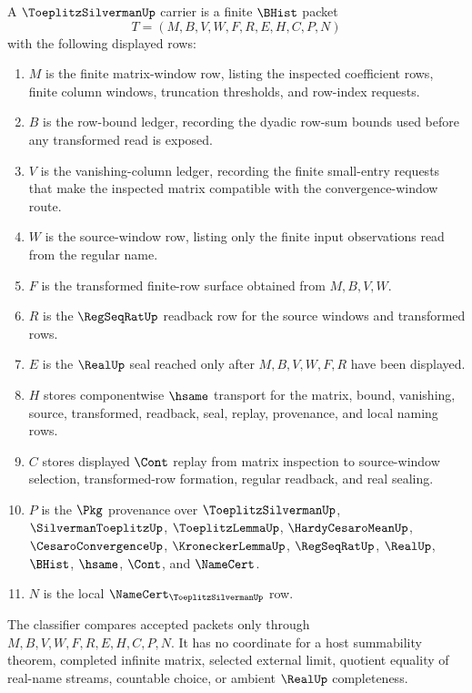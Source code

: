\begin{definition}\label{def:toeplitz-silverman-carrier}
A $\ToeplitzSilvermanUp$ carrier is a finite $\BHist$ packet
$$
T=(M,B,V,W,F,R,E,H,C,P,N)
$$
with the following displayed rows:
\begin{enumerate}
\item $M$ is the finite matrix-window row, listing the inspected coefficient rows, finite column windows, truncation thresholds, and row-index requests.
\item $B$ is the row-bound ledger, recording the dyadic row-sum bounds used before any transformed read is exposed.
\item $V$ is the vanishing-column ledger, recording the finite small-entry requests that make the inspected matrix compatible with the convergence-window route.
\item $W$ is the source-window row, listing only the finite input observations read from the regular name.
\item $F$ is the transformed finite-row surface obtained from $M,B,V,W$.
\item $R$ is the $\RegSeqRatUp$ readback row for the source windows and transformed rows.
\item $E$ is the $\RealUp$ seal reached only after $M,B,V,W,F,R$ have been displayed.
\item $H$ stores componentwise $\hsame$ transport for the matrix, bound, vanishing, source, transformed, readback, seal, replay, provenance, and local naming rows.
\item $C$ stores displayed $\Cont$ replay from matrix inspection to source-window selection, transformed-row formation, regular readback, and real sealing.
\item $P$ is the $\Pkg$ provenance over $\ToeplitzSilvermanUp$, $\SilvermanToeplitzUp$, $\ToeplitzLemmaUp$, $\HardyCesaroMeanUp$, $\CesaroConvergenceUp$, $\KroneckerLemmaUp$, $\RegSeqRatUp$, $\RealUp$, $\BHist$, $\hsame$, $\Cont$, and $\NameCert$.
\item $N$ is the local $\NameCert_{\ToeplitzSilvermanUp}$ row.
\end{enumerate}
The classifier compares accepted packets only through $M,B,V,W,F,R,E,H,C,P,N$. It has no coordinate for a host summability theorem, completed infinite matrix, selected external limit, quotient equality of real-name streams, countable choice, or ambient $\RealUp$ completeness.
\end{definition}

